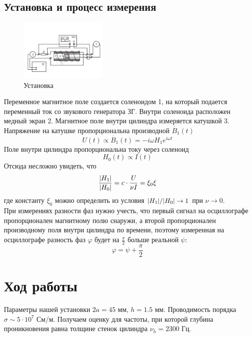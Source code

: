 \documentclass[a4paper, 12pt]{article}
\begin{document}
	\subsection*{Установка и процесс измерения}
	\begin{figure}
		\begin{center}
			\includegraphics[width=0.38\textwidth]{ustanovka.png}
		\end{center}
		\caption{Установка}\label{fig:ustanovka}
	\end{figure}
	
	Переменное магнитное поле создается соленоидом 1, на который подается переменный ток со звукового генератора ЗГ. Внутри соленоида расположен медный экран 2. Магнитное поле внутри цилиндра измеряется катушкой 3. Напряжение на катушке пропорциональна производной $\dot{B_1}(t)$
	\begin{equation*}
		U(t) \propto \dot{B_1}(t) = -i\omega H_1 e^{i\omega t}
	\end{equation*}
	Поле внутри цилиндра пропорциональна току через соленоид
	\begin{equation*}
		H_0(t) \propto I(t)
	\end{equation*}
	Отсюда несложно увидеть, что
	\begin{equation}
		\frac{\abs{H_1}}{\abs{H_0}} = c \cdot \frac{U}{\nu I} = \xi_0 \xi
		\label{eq:otnoshenie_amplitud}
	\end{equation}
	где константу  $\xi_0$ можно определить из условия $\abs{H_1}/\abs{H_0} \rightarrow 1$ при
	$\nu \rightarrow 0$.\\
	
	При измерениях разности фаз нужно учесть, что первый сигнал на осциллографе
	пропорционален магнитному полю снаружи, а второй пропорционален производному
	поля внутри цилиндра по времени, поэтому измеренная на осциллографе разность фаз $\varphi$ будет на $\frac{\pi}{2}$ больше реальной $\psi$:
	\[\varphi = \psi + \frac{\pi}{2}\]
\section{Ход работы}
Параметры нашей установки $2a = 45$ мм, $h=1.5$ мм. Проводимость порядка
$\sigma \sim 5\cdot 10^7$ См/м. Получаем оценку для частоты, при которой
глубина проникновения равна толщине стенок цилиндра $\nu_h = 2300$ Гц.
\end{document}
